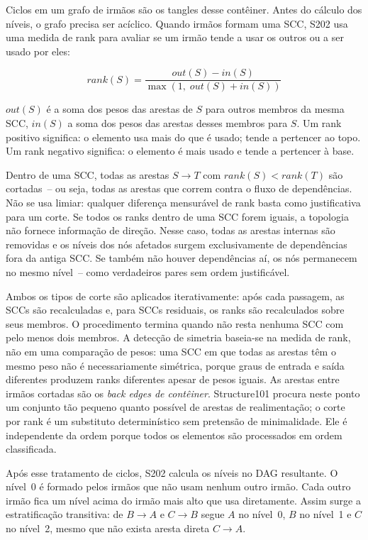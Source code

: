 \documentclass[a4paper,11pt]{article}
\begin{document}
Ciclos em um grafo de irm\~aos s\~ao os tangles desse cont\^einer. Antes do
c\'alculo dos n\'iveis, o grafo precisa ser ac\'iclico. Quando irm\~aos
formam uma SCC, S202 usa uma medida de rank para avaliar se um irm\~ao tende a
usar os outros ou a ser usado por eles:

\[
  rank(S) = \frac{out(S) - in(S)}{\max(1,\; out(S) + in(S))}
\]

$out(S)$ \'e a soma dos pesos das arestas de $S$ para outros membros da mesma
SCC, $in(S)$ a soma dos pesos das arestas desses membros para $S$. Um rank
positivo significa: o elemento usa mais do que \'e usado; tende a pertencer ao
topo. Um rank negativo significa: o elemento \'e mais usado e tende a
pertencer \`a base.

Dentro de uma SCC, todas as arestas $S \to T$ com $rank(S) < rank(T)$ s\~ao
cortadas~-- ou seja, todas as arestas que correm contra o fluxo de
depend\^encias. N\~ao se usa limiar: qualquer diferen\c{c}a mensur\'avel de rank
basta como justificativa para um corte. Se todos os ranks dentro de uma SCC
forem iguais, a topologia n\~ao fornece informa\c{c}\~ao de dire\c{c}\~ao. Nesse
caso, todas as arestas internas s\~ao removidas e os n\'iveis dos n\'os
afetados surgem exclusivamente de depend\^encias fora da antiga SCC. Se
tamb\'em n\~ao houver depend\^encias a\'i, os n\'os permanecem no mesmo
n\'ivel~-- como verdadeiros pares sem ordem justific\'avel.

Ambos os tipos de corte s\~ao aplicados iterativamente: ap\'os cada passagem,
as SCCs s\~ao recalculadas e, para SCCs residuais, os ranks s\~ao recalculados
sobre seus membros. O procedimento termina quando n\~ao resta nenhuma SCC com
pelo menos dois membros. A detec\c{c}\~ao de simetria baseia-se na medida de
rank, n\~ao em uma compara\c{c}\~ao de pesos: uma SCC em que todas as arestas
t\^em o mesmo peso n\~ao \'e necessariamente sim\'etrica, porque graus de
entrada e sa\'ida diferentes produzem ranks diferentes apesar de pesos iguais.
As arestas entre irm\~aos cortadas s\~ao os \emph{back edges de cont\^einer}.
Structure101 procura neste ponto um conjunto t\~ao pequeno quanto poss\'ivel
de arestas de realimenta\c{c}\~ao; o corte por rank \'e um substituto
determin\'istico sem pretens\~ao de minimalidade. Ele \'e independente da
ordem porque todos os elementos s\~ao processados em ordem classificada.

Ap\'os esse tratamento de ciclos, S202 calcula os n\'iveis no DAG resultante.
O n\'ivel~0 \'e formado pelos irm\~aos que n\~ao usam nenhum outro irm\~ao.
Cada outro irm\~ao fica um n\'ivel acima do irm\~ao mais alto que usa
diretamente. Assim surge a estratifica\c{c}\~ao transitiva: de $B \to A$ e
$C \to B$ segue $A$ no n\'ivel~0, $B$ no n\'ivel~1 e $C$ no n\'ivel~2, mesmo
que n\~ao exista aresta direta $C \to A$.
\end{document}
